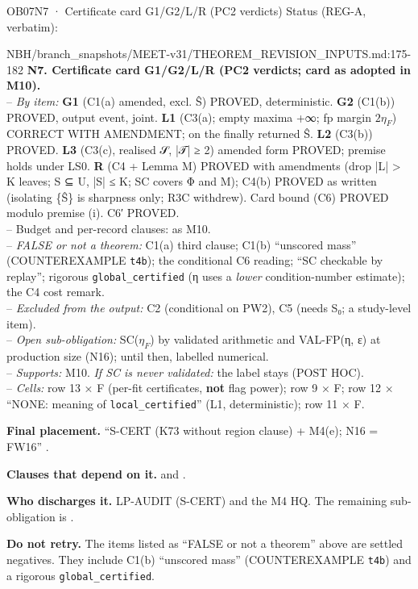 \begin{card}{OB07}{N7 · Certificate card G1/G2/L/R (PC2 verdicts)}
Status (REG-A, verbatim):  
\begin{stmt}{NBH/branch_snapshots/MEET-v31/THEOREM_REVISION_INPUTS.md:175-182}
\textbf{N7. Certificate card G1/G2/L/R (PC2 verdicts; card as adopted in M10).}\\
– \emph{By item:} \textbf{G1} (C1(a) amended, excl. Ŝ) PROVED, deterministic. \textbf{G2} (C1(b)) PROVED, output event, joint. \textbf{L1} (C3(a); empty maxima +∞; fp margin $2η_F$) CORRECT WITH AMENDMENT; on the finally returned Ŝ. \textbf{L2} (C3(b)) PROVED. \textbf{L3} (C3(c), realised 𝒮, |𝒯| ≥ 2) amended form PROVED; premise holds under LS0. \textbf{R} (C4 + Lemma M) PROVED with amendments (drop |L| > K leaves; S ⊆ U, |S| ≤ K; SC covers Φ and M); C4(b) PROVED as written (isolating \{Ŝ\} is sharpness only; R3C withdrew). Card bound (C6) PROVED modulo premise (i). C6′ PROVED.\\
– Budget and per-record clauses: as M10.\\
– \emph{FALSE or not a theorem:} C1(a) third clause; C1(b) ``unscored mass'' (COUNTEREXAMPLE \texttt{t4b}); the conditional C6 reading; ``SC checkable by replay''; rigorous \texttt{global\_certified} (η uses a \emph{lower} condition-number estimate); the C4 cost remark.\\
– \emph{Excluded from the output:} C2 (conditional on PW2), C5 (needs S₀; a study-level item).\\
– \emph{Open sub-obligation:} SC($η_F$) by validated arithmetic and VAL-FP(η, ε) at production size (N16); until then, labelled numerical.\\
– \emph{Supports:} M10. \emph{If SC is never validated:} the label stays (POST HOC).\\
– \emph{Cells:} row 13 × F (per-fit certificates, \textbf{not} flag power); row 9 × F; row 12 × ``NONE: meaning of \texttt{local\_certified}'' (L1, deterministic); row 11 × F.
\end{stmt}
\textbf{Final placement.} ``S-CERT (K73 without region clause) + M4(e); N16 = FW16'' .

\textbf{Clauses that depend on it.}  and .

\textbf{Who discharges it.} LP-AUDIT (S-CERT) and the M4 HQ. The remaining sub-obligation is .

\textbf{Do not retry.} The items listed as ``FALSE or not a theorem'' above are settled negatives. They include C1(b) ``unscored mass'' (COUNTEREXAMPLE \texttt{t4b}) and a rigorous \texttt{global\_certified}.
\end{card}

